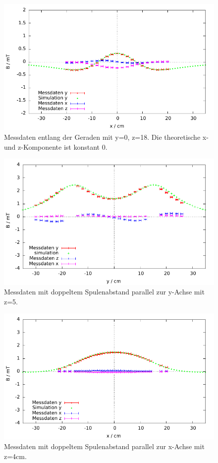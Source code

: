 \documentclass[12pt,a4paper]{article}
\begin{document}
\begin{figure}[H]
	\centering
	\includegraphics[scale=1]{abs1_Auswertung_parallel_5}
	\caption{Messdaten entlang der Geraden mit y=0, z=18. Die theoretische x- und z-Komponente ist konstant 0.}
	\label{fig:p5}
\end{figure}
\begin{figure}[H]
	\centering
	\includegraphics[scale=1]{abs2_Auswertung_axial_1.pdf}
	\caption{Messdaten mit doppeltem Spulenabstand parallel zur y-Achse mit z=5.}
	\label{fig:p6}
\end{figure}
\begin{figure}[H]
	\centering
	\includegraphics[scale=1]{abs21.pdf}
	\caption{Messdaten mit doppeltem Spulenabstand parallel zur x-Achse mit z=4cm.}
	\label{fig:p7}
\end{figure}
\end{document}
